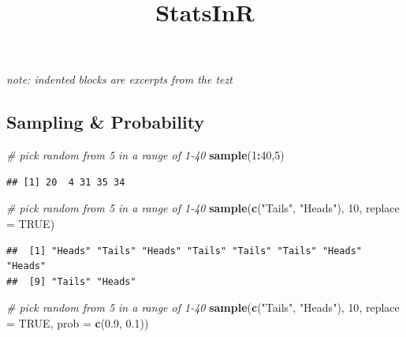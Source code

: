 \documentclass[]{article}
\title{StatsInR}
\author{}
\date{}
\newenvironment{Shaded}{\begin{snugshade}}{\end{snugshade}}
\newcommand{\KeywordTok}[1]{\textcolor[rgb]{0.13,0.29,0.53}{\textbf{#1}}}
\newcommand{\DataTypeTok}[1]{\textcolor[rgb]{0.13,0.29,0.53}{#1}}
\newcommand{\DecValTok}[1]{\textcolor[rgb]{0.00,0.00,0.81}{#1}}
\newcommand{\FloatTok}[1]{\textcolor[rgb]{0.00,0.00,0.81}{#1}}
\newcommand{\StringTok}[1]{\textcolor[rgb]{0.31,0.60,0.02}{#1}}
\newcommand{\CommentTok}[1]{\textcolor[rgb]{0.56,0.35,0.01}{\textit{#1}}}
\newcommand{\OtherTok}[1]{\textcolor[rgb]{0.56,0.35,0.01}{#1}}
\newcommand{\OperatorTok}[1]{\textcolor[rgb]{0.81,0.36,0.00}{\textbf{#1}}}
\newcommand{\NormalTok}[1]{#1}
\begin{document}
\maketitle

\emph{note: indented blocks are excerpts from the tezt}

\subsection{Sampling \& Probability}\label{sampling-probability}

\begin{Shaded}
\begin{Highlighting}[]
\CommentTok{# pick random from 5 in a range of 1-40}
\KeywordTok{sample}\NormalTok{(}\DecValTok{1}\OperatorTok{:}\DecValTok{40}\NormalTok{,}\DecValTok{5}\NormalTok{)}
\end{Highlighting}
\end{Shaded}

\begin{verbatim}
## [1] 20  4 31 35 34
\end{verbatim}

\begin{Shaded}
\begin{Highlighting}[]
\CommentTok{# pick random from 5 in a range of 1-40}
\KeywordTok{sample}\NormalTok{(}\KeywordTok{c}\NormalTok{(}\StringTok{"Tails"}\NormalTok{, }\StringTok{"Heads"}\NormalTok{), }\DecValTok{10}\NormalTok{, }\DataTypeTok{replace =} \OtherTok{TRUE}\NormalTok{)}
\end{Highlighting}
\end{Shaded}

\begin{verbatim}
##  [1] "Heads" "Tails" "Heads" "Tails" "Tails" "Tails" "Heads" "Heads"
##  [9] "Tails" "Heads"
\end{verbatim}

\begin{Shaded}
\begin{Highlighting}[]
\CommentTok{# pick random from 5 in a range of 1-40}
\KeywordTok{sample}\NormalTok{(}\KeywordTok{c}\NormalTok{(}\StringTok{"Tails"}\NormalTok{, }\StringTok{"Heads"}\NormalTok{), }\DecValTok{10}\NormalTok{, }\DataTypeTok{replace =} \OtherTok{TRUE}\NormalTok{, }\DataTypeTok{prob =} \KeywordTok{c}\NormalTok{(}\FloatTok{0.9}\NormalTok{, }\FloatTok{0.1}\NormalTok{))}
\end{Highlighting}
\end{Shaded}
\end{document}
